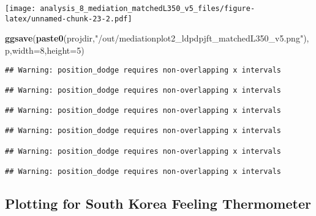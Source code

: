 \documentclass[
]{article}
\newenvironment{Shaded}{\begin{snugshade}}{\end{snugshade}}
\newcommand{\DataTypeTok}[1]{\textcolor[rgb]{0.13,0.29,0.53}{#1}}
\newcommand{\DecValTok}[1]{\textcolor[rgb]{0.00,0.00,0.81}{#1}}
\newcommand{\KeywordTok}[1]{\textcolor[rgb]{0.13,0.29,0.53}{\textbf{#1}}}
\newcommand{\NormalTok}[1]{#1}
\newcommand{\StringTok}[1]{\textcolor[rgb]{0.31,0.60,0.02}{#1}}
\begin{document}
\texttt{[image: analysis\_8\_mediation\_matchedL350\_v5\_files/figure-latex/unnamed-chunk-23-2.pdf]}

\begin{Shaded}
\begin{Highlighting}[]
\KeywordTok{ggsave}\NormalTok{(}\KeywordTok{paste0}\NormalTok{(projdir,}\StringTok{"/out/mediationplot2_ldpdpjft_matchedL350_v5.png"}\NormalTok{),p,}\DataTypeTok{width=}\DecValTok{8}\NormalTok{,}\DataTypeTok{height=}\DecValTok{5}\NormalTok{)}
\end{Highlighting}
\end{Shaded}

\begin{verbatim}
## Warning: position_dodge requires non-overlapping x intervals

## Warning: position_dodge requires non-overlapping x intervals

## Warning: position_dodge requires non-overlapping x intervals

## Warning: position_dodge requires non-overlapping x intervals

## Warning: position_dodge requires non-overlapping x intervals

## Warning: position_dodge requires non-overlapping x intervals
\end{verbatim}

\hypertarget{plotting-for-south-korea-feeling-thermometer}{%
\subsection{Plotting for South Korea Feeling
Thermometer}\label{plotting-for-south-korea-feeling-thermometer}}
\end{document}
